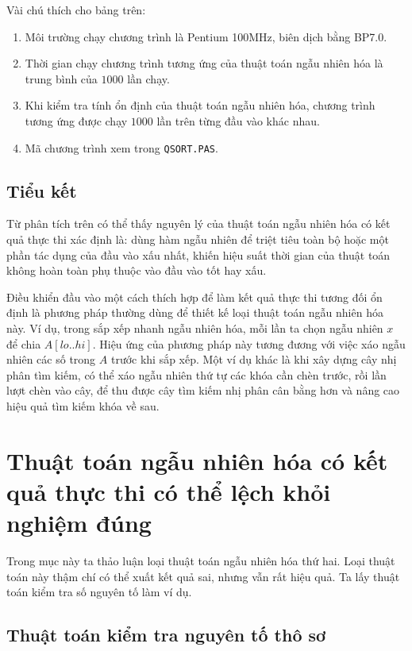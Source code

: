 \documentclass[11pt]{article}
\begin{document}
Vài chú thích cho bảng trên:
\begin{enumerate}
  \item Môi trường chạy chương trình là Pentium 100MHz, biên dịch bằng BP7.0.
  \item Thời gian chạy chương trình tương ứng của thuật toán ngẫu nhiên hóa là
  trung bình của \(1000\) lần chạy.
  \item Khi kiểm tra tính ổn định của thuật toán ngẫu nhiên hóa, chương trình
  tương ứng được chạy \(1000\) lần trên từng đầu vào khác nhau.
  \item Mã chương trình xem trong \texttt{QSORT.PAS}.
\end{enumerate}

\subsection{Tiểu kết}

Từ phân tích trên có thể thấy nguyên lý của thuật toán ngẫu nhiên hóa có kết
quả thực thi xác định là: dùng hàm ngẫu nhiên để triệt tiêu toàn bộ hoặc một
phần tác dụng của đầu vào xấu nhất, khiến hiệu suất thời gian của thuật toán
không hoàn toàn phụ thuộc vào đầu vào tốt hay xấu.

Điều khiển đầu vào một cách thích hợp để làm kết quả thực thi tương đối ổn
định là phương pháp thường dùng để thiết kế loại thuật toán ngẫu nhiên hóa
này. Ví dụ, trong sắp xếp nhanh ngẫu nhiên hóa, mỗi lần ta chọn ngẫu nhiên
\(x\) để chia \(A[lo..hi]\). Hiệu ứng của phương pháp này tương đương với
việc xáo ngẫu nhiên các số trong \(A\) trước khi sắp xếp. Một ví dụ khác là
khi xây dựng cây nhị phân tìm kiếm, có thể xáo ngẫu nhiên thứ tự các khóa cần
chèn trước, rồi lần lượt chèn vào cây, để thu được cây tìm kiếm nhị phân cân
bằng hơn và nâng cao hiệu quả tìm kiếm khóa về sau.

\section{Thuật toán ngẫu nhiên hóa có kết quả thực thi có thể lệch khỏi nghiệm đúng}

Trong mục này ta thảo luận loại thuật toán ngẫu nhiên hóa thứ hai. Loại thuật
toán này thậm chí có thể xuất kết quả sai, nhưng vẫn rất hiệu quả. Ta lấy
thuật toán kiểm tra số nguyên tố làm ví dụ.

\subsection{Thuật toán kiểm tra nguyên tố thô sơ}
\end{document}
